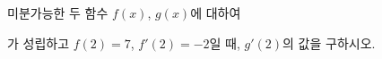 미분가능한 두 함수 $f(x)$, $g(x)$에 대하여 \par\smallskip{}\par\smallskip\noindent 가 성립하고 $f(2)=7$, $f'(2)=-2$일 때, $g'(2)$의 값을 구하시오.
